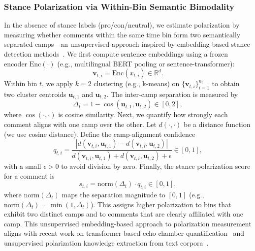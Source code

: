 \documentclass[journal]{IEEEtran}
\begin{document}
\subsubsection{Stance Polarization via Within-Bin Semantic Bimodality}
In the absence of stance labels (pro/con/neutral), we estimate polarization by measuring whether comments within the same time bin form two semantically separated camps---an unsupervised approach inspired by embedding-based stance detection methods~\cite{kucuk2020stance}. We first compute sentence embeddings using a frozen encoder $\mathrm{Enc}(\cdot)$ (e.g., multilingual BERT pooling or sentence-transformer):
\begin{equation}
\mathbf{v}_{t,i} = \mathrm{Enc}(x_{t,i}) \in \mathbb{R}^d.
\label{eq:embedding}
\end{equation}
Within bin $t$, we apply $k{=}2$ clustering (e.g., k-means) on $\{\mathbf{v}_{t,i}\}_{i=1}^{n_t}$ to obtain two cluster centroids $\mathbf{u}_{t,1}$ and $\mathbf{u}_{t,2}$. The inter-camp separation is measured by
\begin{equation}
\Delta_t = 1 - \cos(\mathbf{u}_{t,1}, \mathbf{u}_{t,2}) \in [0,2],
\label{eq:camp_separation}
\end{equation}
where $\cos(\cdot,\cdot)$ is cosine similarity. Next, we quantify how strongly each comment aligns with one camp over the other. Let $d(\cdot,\cdot)$ be a distance function (we use cosine distance). Define the camp-alignment confidence
\begin{equation}
q_{t,i} = \frac{\left|d(\mathbf{v}_{t,i},\mathbf{u}_{t,1}) - d(\mathbf{v}_{t,i},\mathbf{u}_{t,2})\right|}
{d(\mathbf{v}_{t,i},\mathbf{u}_{t,1}) + d(\mathbf{v}_{t,i},\mathbf{u}_{t,2}) + \epsilon} \in [0,1],
\label{eq:alignment_confidence}
\end{equation}
with a small $\epsilon>0$ to avoid division by zero. Finally, the stance polarization score for a comment is
\begin{equation}
s_{t,i} = \mathrm{norm}(\Delta_t)\cdot q_{t,i} \in [0,1],
\label{eq:stance_score}
\end{equation}
where $\mathrm{norm}(\Delta_t)$ maps the separation magnitude to $[0,1]$ (e.g., $\mathrm{norm}(\Delta_t)=\min(1,\Delta_t)$). This assigns higher polarization to bins that exhibit two distinct camps and to comments that are clearly affiliated with one camp. This unsupervised embedding-based approach to polarization measurement aligns with recent work on transformer-based echo chamber quantification~\cite{ghafouri2024echo} and unsupervised polarization knowledge extraction from text corpora~\cite{paschalides2025polar}.
\end{document}
